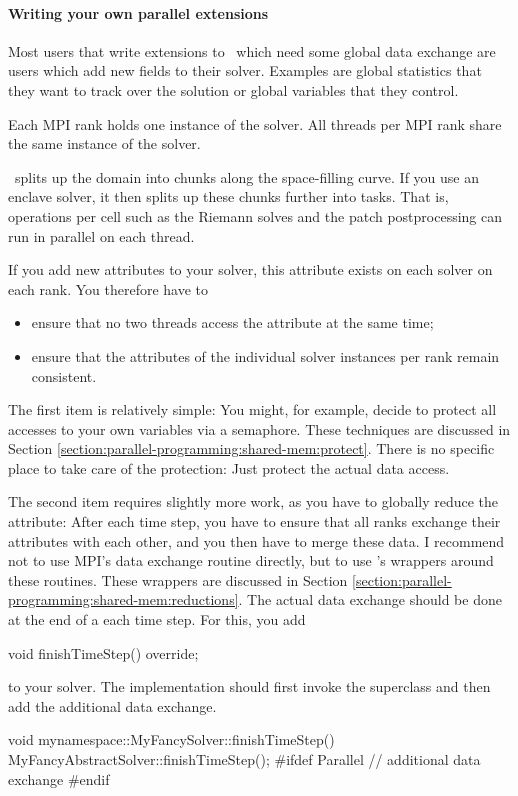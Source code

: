 \paragraph{Writing your own parallel extensions}

Most users that write extensions to \ExaHyPE\ which need some global data
exchange are users which add new fields to their solver. Examples are global
statistics that they want to track over the solution or global variables that
they control.

\begin{definition}
 Each MPI rank holds one instance of the solver. 
 All threads per MPI rank share the same instance of the solver.
\end{definition}


\noindent
\Peano\ splits up the domain into chunks along the space-filling curve. 
If you use an enclave solver, it then splits up these chunks further into tasks.
That is, operations per cell such as the Riemann solves and the patch
postprocessing can run in parallel on each thread.

If you add new attributes to your solver, this attribute exists on each solver
on each rank. 
You therefore have to 
\begin{itemize}
  \item ensure that no two threads access the attribute at the same time;
  \item ensure that the attributes of the individual solver instances per rank
  remain consistent.
\end{itemize}

\noindent
The first item is relatively simple: You might, for example, decide to protect
all accesses to your own variables via a semaphore. 
These techniques are discussed in Section
\ref{section:parallel-programming:shared-mem:protect}.
There is no specific place to take care of the protection: 
Just protect the actual data access.


The second item requires slightly more work, as you have to globally reduce the
attribute: After each time step, you have to ensure that all ranks exchange
their attributes with each other, and you then have to merge these data.
I recommend not to use MPI's data exchange routine directly, but to use \Peano's 
wrappers around these routines. 
These wrappers are discussed in Section
\ref{section:parallel-programming:shared-mem:reductions}.
The actual data exchange should be done at the end of a each time step. 
For this, you add
\begin{code}
  void finishTimeStep() override;
\end{code}
to your solver. The implementation should first invoke the superclass
and then add the additional data exchange.
\begin{code}
void mynamespace::MyFancySolver::finishTimeStep() {
  MyFancyAbstractSolver::finishTimeStep();
  #ifdef Parallel
  // additional data exchange
  #endif
}
\end{code}



